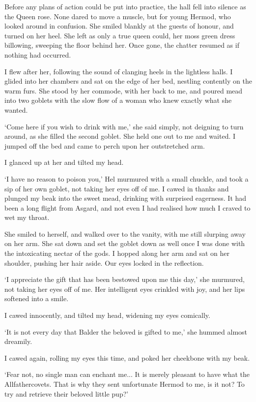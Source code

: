 Before any plans of action could be put into practice, the hall fell into silence as the Queen rose. None dared to move a muscle, but for young Hermod, who looked around in confusion. She smiled blankly at the guests of honour, and turned on her heel. She left as only a true queen could, her moss green dress billowing, sweeping the floor behind her. Once gone, the chatter resumed as if nothing had occurred. 

I flew after her, following the sound of clanging heels in the lightless halls. I glided into her chambers and sat on the edge of her bed, nestling contently on the warm furs. She stood by her commode, with her back to me, and poured mead into two goblets with the slow flow of a woman who knew exactly what she wanted. 

`Come here if you wish to drink with me,' she said simply, not deigning to turn around, as she filled the second goblet. She held one out to me and waited. I jumped off the bed and came to perch upon her outstretched arm. 

I glanced up at her and tilted my head.

`I have no reason to poison you,' Hel murmured with a small chuckle, and took a sip of her own goblet, not taking her eyes off of me. I cawed in thanks and plunged my beak into the sweet mead, drinking with surprised eagerness. It had been a long flight from Asgard, and not even I had realised how much I craved to wet my throat.

She smiled to herself, and walked over to the vanity, with me still slurping away on her arm. She sat down and set the goblet down as well once I was done with the intoxicating nectar of the gods. I hopped along her arm and sat on her shoulder, pushing her hair aside. Our eyes locked in the reflection. 

`I appreciate the gift that has been bestowed upon me this day,' she murmured, not taking her eyes off of me. Her intelligent eyes crinkled with joy, and her lips softened into a smile.

I cawed innocently, and tilted my head, widening my eyes comically.

`It is not every day that Balder the beloved is gifted to me,' she hummed almost dreamily. 

I cawed again, rolling my eyes this time, and poked her cheekbone with my beak.

`Fear not, no single man can enchant me... It is merely pleasant to have what the Allfather\footnotemark[1] covets. That is why they sent unfortunate Hermod to me, is it not? To try and retrieve their beloved little pup?'

